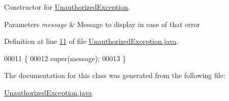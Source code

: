 Constructor for \hyperlink{classUnauthorizedException}{Unauthorized\-Exception}. 


\begin{DoxyParams}{Parameters}
{\em message} & Message to display in case of that error \\
\hline
\end{DoxyParams}


Definition at line \hyperlink{UnauthorizedException_8java_source_l00011}{11} of file \hyperlink{UnauthorizedException_8java_source}{Unauthorized\-Exception.\-java}.


\begin{DoxyCode}
00011                                                 \{
00012         super(message);
00013     \}
\end{DoxyCode}


The documentation for this class was generated from the following file\-:\begin{DoxyCompactItemize}
\item 
\hyperlink{UnauthorizedException_8java}{Unauthorized\-Exception.\-java}\end{DoxyCompactItemize}
